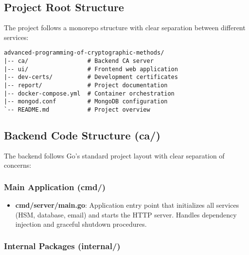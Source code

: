 \subsection{Project Root Structure}

The project follows a monorepo structure with clear separation between different services:

\begin{verbatim}
advanced-programming-of-cryptographic-methods/
|-- ca/                 # Backend CA server
|-- ui/                 # Frontend web application
|-- dev-certs/          # Development certificates
|-- report/             # Project documentation
|-- docker-compose.yml  # Container orchestration
|-- mongod.conf         # MongoDB configuration
`-- README.md           # Project overview
\end{verbatim}

\subsection{Backend Code Structure (ca/)}

The backend follows Go's standard project layout with clear separation of concerns:

\subsubsection{Main Application (cmd/)}

\begin{itemize}
    \item \textbf{cmd/server/main.go}: Application entry point that initializes all services (HSM, database, email) and starts the HTTP server. Handles dependency injection and graceful shutdown procedures.
\end{itemize}

\subsubsection{Internal Packages (internal/)}

